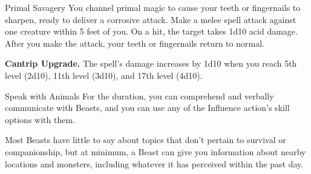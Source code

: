 \begin{Spell}[
    level=Cantrip,
    time=1 Action,
    range=5 ft.,
    components={S},
    duration=Instantaneous,
    school=Transmutation,
    attack=Melee,
    effect=Acid
  ]{Primal Savagery}
You channel primal magic to cause your teeth or fingernails to sharpen, ready to deliver a corrosive attack. Make a melee spell attack against one creature within 5 feet of you. On a hit, the target takes 1d10 acid damage. After you make the attack, your teeth or fingernails return to normal.

\textbf{Cantrip Upgrade.} The spell's damage increases by 1d10 when you reach 5th level (2d10), 11th level (3d10), and 17th level (4d10).
\end{Spell}


\begin{Spell}[
    tags=Ritual,
    level=1st,
    time=1 Action,
    range=Self,
    components={V,S},
    duration=10 Minutes,
    school=Divination,
    attack=None,
    effect=Communication
  ]{Speak with Animals}
For the duration, you can comprehend and verbally communicate with Beasts, and you can use any of the Influence action's skill options with them.

Most Beasts have little to say about topics that don't pertain to survival or companionship, but at minimum, a Beast can give you information about nearby locations and monsters, including whatever it has perceived within the past day.
\end{Spell}

